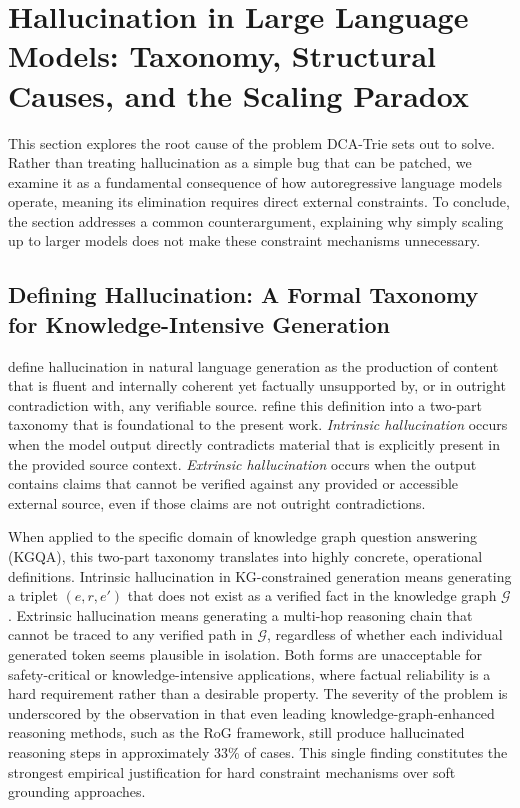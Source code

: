 \section{Hallucination in Large Language Models: Taxonomy, Structural Causes,
  and the Scaling Paradox}
\label{sec:hallucination}

This section explores the root cause of the problem DCA-Trie sets out to solve. Rather than treating hallucination as a simple bug that can be patched, we examine it as a fundamental consequence of how autoregressive language models operate, meaning its elimination requires direct external constraints. To conclude, the section addresses a common counterargument, explaining why simply scaling up to larger models does not make these constraint mechanisms unnecessary.

\subsection{Defining Hallucination: A Formal Taxonomy for Knowledge-Intensive
    Generation}

\citet{ji2023survey} define hallucination in natural language generation as the
production of content that is fluent and internally coherent yet factually
unsupported by, or in outright contradiction with, any verifiable source.
\citet{huang2023survey} refine this definition into a two-part taxonomy that
is foundational to the present work. \textit{Intrinsic hallucination} occurs
when the model output directly contradicts material that is explicitly present in
the provided source context. \textit{Extrinsic hallucination} occurs when the
output contains claims that cannot be verified against any provided or
accessible external source, even if those claims are not outright contradictions.

When applied to the specific domain of knowledge graph question answering (KGQA), this two-part taxonomy translates into highly concrete, operational definitions. Intrinsic hallucination in KG-constrained generation means generating a triplet $(e, r, e')$ that does not exist as a verified fact in the knowledge graph $\mathcal{G}$. Extrinsic hallucination means generating a multi-hop reasoning chain that cannot be traced to any verified path in $\mathcal{G}$, regardless of whether each individual generated token seems plausible in isolation. Both forms are unacceptable for safety-critical or knowledge-intensive applications, where factual reliability is a hard requirement rather than a desirable property. The severity of the problem is underscored by the observation in \citet{luo2024gcr} that even leading knowledge-graph-enhanced reasoning methods, such as the RoG framework, still produce hallucinated reasoning steps in approximately 33\% of cases. This single finding constitutes the strongest empirical justification for hard constraint mechanisms over soft grounding approaches.

